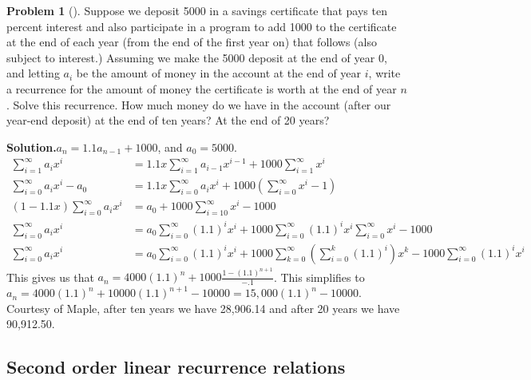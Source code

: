 \documentclass[10pt,]{book}
\theoremstyle{plain}
\theoremstyle{definition}
\newtheorem{activity}[project]{Problem}
\theoremstyle{definition}
\numberwithin{equation}{chapter}
\newcommand{\amp}{&}
\begin{document}
\begin{activity}[]\label{activity-212}
Suppose we deposit \textdollar{}5000 in a savings certificate that pays ten percent interest and also participate in a program to add \textdollar{}1000 to the certificate at the end of each year (from the end of the first year on) that follows (also subject to interest.) Assuming we make the \textdollar{}5000 deposit at the end of year 0, and letting \(a_i\) be the amount of money in the account at the end of year \(i\), write a recurrence for the amount of money the certificate is worth at the end of year \(n\). Solve this recurrence. How much money do we have in the account (after our year-end deposit) at the end of ten years?  At the end of 20 years?%
\par\medskip\noindent%
\textbf{Solution.}\quad \(a_n=1.1a_{n-1}+1000\), and \(a_0=5000\).%
\begin{align*}
\sum_{i=1}^\infty
a_ix^i \amp= 1.1x\sum_{i=1}^\infty a_{i-1}x^{i-1} + 1000\sum_{i=1}^\infty x^i\\
\sum_{i=0}^\infty a_ix^i -a_0 \amp=
1.1x\sum_{i=0}^\infty a_ix^i +1000(\sum_{i=0}^\infty x^i-1)\\
(1-1.1x)\sum_{i=0}^\infty a_ix^i  \amp=  a_0 +1000\sum_{i=10}^\infty x^i-1000\\
\sum_{i=0}^\infty a_i x^i \amp=  a_0\sum_{i=0}^\infty (1.1)^ix^i
+1000\sum_{i=0}^\infty (1.1)^ix^i\sum_{i=0}^\infty x^i -1000\\
\sum_{i=0}^\infty a_i x^i \amp=  a_0\sum_{i=0}^\infty (1.1)^ix^i
+1000\sum_{k=0}^\infty \left(\sum_{i=0}^k(1.1)^i\right)x^k
- 1000\sum_{i=0}^\infty (1.1)^ix^i
\end{align*}
This gives us that \(a_n= 4000(1.1)^n +1000 \frac{1-(1.1)^{n+1}}{-.1}\). This simplifies to \(a_n= 4000(1.1)^n+10000(1.1)^{n+1}-10000 = 15,000(1.1)^n-10000\). Courtesy of Maple, after ten years we have \textdollar{}28,906.14 and after 20 years we have \textdollar{}90,912.50.%
\end{activity}
\typeout{************************************************}
\typeout{************************************************}
\subsection[{Second order linear recurrence relations}]{Second order linear recurrence relations}\label{subsection-40}
\typeout{************************************************}
\typeout{************************************************}
\end{document}
